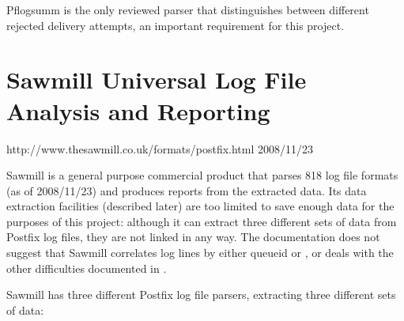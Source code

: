 Pflogsumm is the only reviewed parser that distinguishes between different
rejected delivery attempts, an important requirement for this project.

\section{Sawmill Universal Log File Analysis and Reporting}

{http://www.thesawmill.co.uk/formats/postfix.html}
{2008/11/23}

Sawmill is a general purpose commercial product that parses 818 log file
formats (as of 2008/11/23) and produces reports from the extracted data.
Its data extraction facilities (described later) are too limited to save
enough data for the purposes of this project: although it can extract three
different sets of data from Postfix log files, they are not linked in any
way.  The documentation does not suggest that Sawmill correlates log lines
by either queueid or , or deals with the other difficulties
documented in .

Sawmill has three different Postfix log file parsers, extracting three
different sets of data:

